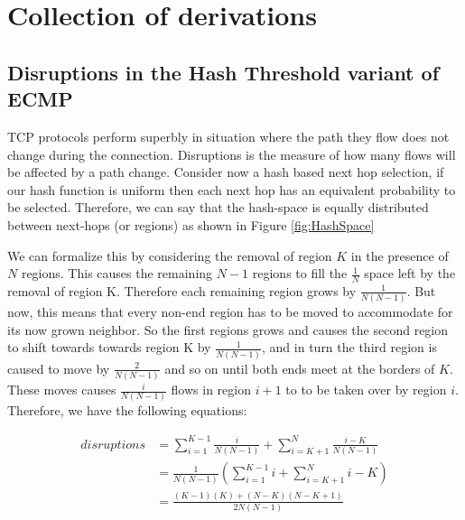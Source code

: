 \chapter{Collection of derivations}
\ifpdf
  \graphicspath{{9-Appendix1/}}
\else
  \graphicspath{{9-Appendix1/}}
\fi

\label{appdx:A}

\section{Disruptions in the Hash Threshold variant of ECMP}
\label{sect:HTE} 

TCP protocols perform superbly in situation where the path they flow does not change during the connection. Disruptions is the measure of how many flows will be affected by a path change. Consider now a hash based next hop selection, if our hash function is uniform then each next hop has an equivalent probability to be selected. Therefore, we can say that the hash-space is equally distributed between next-hops (or regions) as shown in Figure \ref{fig:HashSpace}


We can formalize this by considering the removal of region $K$ in the presence of $N$ regions. This causes the remaining $N-1$ regions to fill the $\frac{1}{N}$ space left by the removal of region K. Therefore each remaining region grows by $\frac{1}{N(N-1)}$. But now, this means that every non-end region has to be moved to accommodate for its now grown neighbor. So the first regions grows and causes the second region to shift towards towards region K by $\frac{1}{N(N-1)}$, and in turn the third region is caused to move by $\frac{2}{N(N-1)}$ and so on until both ends meet at the borders of $K$. These moves causes $\frac{i}{N(N-1)}$ flows in region $i+1$ to to be taken over by region $i$. Therefore, we have the following equations:

 \begin{align}
 disruptions &= \displaystyle\sum\limits_{i=1} ^{K-1}\frac{i}{N(N-1)} +  \displaystyle\sum\limits_{i=K+1} ^{N}\frac{i-K}{N(N-1)}\\
 &= \frac{1}{N(N-1)} \left(  \displaystyle\sum\limits_{i=1} ^{K-1}i + \displaystyle\sum\limits_{i=K+1} ^{N}i-K\right)\\
 &= \frac{(K-1)(K) + (N-K)(N-K+1)}{2N(N-1)}
 \label{eq:disrupt}
\end{align}

